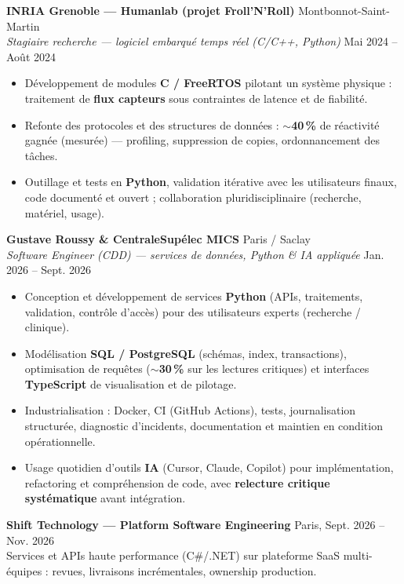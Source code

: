 \documentclass[10pt,a4paper]{article}
\begin{document}
\textbf{INRIA Grenoble --- Humanlab (projet Froll'N'Roll)} \hfill Montbonnot-Saint-Martin\\
\textit{Stagiaire recherche --- logiciel embarqu\'e temps r\'eel (C/C++, Python)} \hfill Mai 2024 -- Ao\^ut 2024
\begin{itemize}
  \item D\'eveloppement de modules \textbf{C / FreeRTOS} pilotant un syst\`eme physique : traitement de \textbf{flux capteurs} sous contraintes de latence et de fiabilit\'e.
  \item Refonte des protocoles et des structures de donn\'ees : \textbf{$\sim$40\,\%} de r\'eactivit\'e gagn\'ee (mesur\'ee) --- profiling, suppression de copies, ordonnancement des t\^aches.
  \item Outillage et tests en \textbf{Python}, validation it\'erative avec les utilisateurs finaux, code document\'e et ouvert ; collaboration pluridisciplinaire (recherche, mat\'eriel, usage).
\end{itemize}

\textbf{Gustave Roussy \& CentraleSup\'elec MICS} \hfill Paris / Saclay\\
\textit{Software Engineer (CDD) --- services de donn\'ees, Python \& IA appliqu\'ee} \hfill Jan. 2026 -- Sept. 2026
\begin{itemize}
  \item Conception et d\'eveloppement de services \textbf{Python} (APIs, traitements, validation, contr\^ole d'acc\`es) pour des utilisateurs experts (recherche / clinique).
  \item Mod\'elisation \textbf{SQL / PostgreSQL} (sch\'emas, index, transactions), optimisation de requ\^etes (\textbf{$\sim$30\,\%} sur les lectures critiques) et interfaces \textbf{TypeScript} de visualisation et de pilotage.
  \item Industrialisation : Docker, CI (GitHub Actions), tests, journalisation structur\'ee, diagnostic d'incidents, documentation et maintien en condition op\'erationnelle.
  \item Usage quotidien d'outils \textbf{IA} (Cursor, Claude, Copilot) pour impl\'ementation, refactoring et compr\'ehension de code, avec \textbf{relecture critique syst\'ematique} avant int\'egration.
\end{itemize}

\textbf{Shift Technology --- Platform Software Engineering} \hfill Paris, Sept. 2026 -- Nov. 2026\\
Services et APIs haute performance (C\#/.NET) sur plateforme SaaS multi-\'equipes : revues, livraisons incr\'ementales, ownership production.
\end{document}

